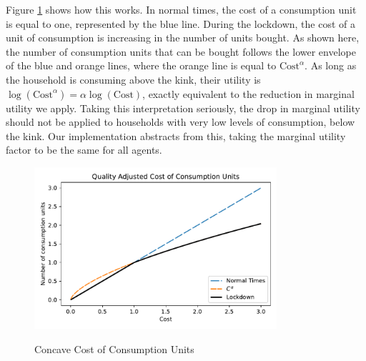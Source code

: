 \documentclass[./ConsumptionResponse]{subfiles}
\begin{document}
Figure \ref{concave_cons} shows how this works.
In normal times, the cost of a consumption unit is equal to one, represented by the blue line.
During the lockdown, the cost of a unit of consumption is increasing in the number of units bought.
As shown here, the number of consumption units that can be bought follows the lower envelope of the blue and orange lines, where the orange line is equal to $\text{Cost}^\alpha$.
As long as the household is consuming above the kink, their utility is $\log (\text{Cost}^\alpha) = \alpha \log (\text{Cost})$, exactly equivalent to the reduction in marginal utility we apply. Taking this interpretation seriously, the drop in marginal utility should not be applied to households with very low levels of consumption, below the kink.
Our implementation abstracts from this, taking the marginal utility factor to be the same for all agents.
\begin{figure}
  \centering
  \caption{Concave Cost of Consumption Units}
  \label{concave_cons}
  { \includegraphics[width=0.8\textwidth]{./Figures/QualityCost}}
\end{figure}
\end{document}

